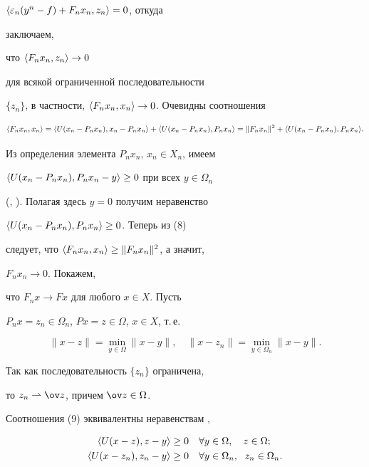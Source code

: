 $\langle\varepsilon_n(y^n-f)+F_n x_n,z_n\rangle=0$, откуда 


заключаем, 


что $\langle F_n x_n,z_n\rangle\to 0$ 


для всякой ограниченной последовательности 


$\{z_n\}$, в частности, $\langle F_n x_n,x_n\rangle\to 0$. Очевидны соотношения 


\begin{equation} 


\la F_n x_n,x_n\ra=\la U(x_n-P_n x_n),x_n-P_n x_n\ra+ 


\la U(x_n-P_n x_n),P_n x_n\ra=\|F_n x_n\|^2 


+\la U(x_n-P_n x_n),P_n x_n\ra. 


\end{equation} 


Из определения элемента $P_n x_n$, $x_n\in X_n$, имеем 


$\langle U(x_n-P_n x_n),P_n x_n-y\rangle\ge 0$ при всех $y\in\Omega_n$ 


(\cite{2}, \cite{4}). Полагая здесь $y=0$ получим неравенство 


$\langle U(x_n-P_n x_n),P_n x_n\rangle\ge 0$. Теперь из (8) 


следует, что $\langle F_n x_n,x_n\rangle\ge\|F_n x_n\|^2$, а значит, 


$F_n x_n\to 0$. Покажем, 


что $F_n x\to F x$ для любого $x\in X$. Пусть 


$P_n x=z_n\in\Omega_n$, $Px=z\in\Omega$, $x\in X$, т.\,е. 


\begin{equation} 


\|x-z\|=\min_{y\in\Omega}\|x-y\|,\quad 


\|x-z_n\|=\min_{y\in\Omega_n}\|x-y\|. 


\end{equation} 


Так как последовательность $\{z_n\}$ ограничена, 


то $z_n\rightharpoonup\ov z$, причем $\ov z\in\Omega$. 


Соотношения (9) эквивалентны неравенствам \cite{2}, \cite{4} 


\begin{align} 


\la U(x-z),z-y\ra&\ge 0\quad \forall y\in\Omega,\quad z\in\Omega;\\ 


\la U(x-z_n),z_n-y\ra&\ge 0\quad \forall y\in\Omega_n, 


\ \; z_n\in\Omega_n. 


\end{align} 


